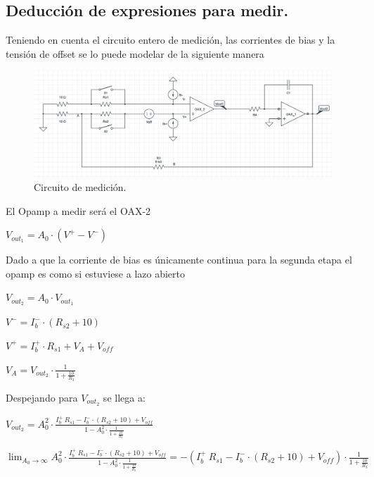 \subsection{Deducción de expresiones para medir.}

Teniendo en cuenta el circuito entero de medición, las corrientes de bias y la tensión de offset se lo puede modelar de la siguiente manera
\begin{figure}[H]	
	\centering
	\includegraphics[width=\textwidth]{imagenes/Medicion.PNG}
	\caption{Circuito de medición.}
	\label{fig:Medicion}
\end{figure}
El Opamp a medir será el OAX-2
\begin{center}$V_{out_1}=A_0 \cdot (V^+ - V^-)$\\\end{center}
Dado a que la corriente de bias es únicamente continua para la segunda etapa el opamp es como si estuviese a lazo abierto\\
\begin{center}$V_{out_2}=A_0 \cdot V_{out_1}$\\\end{center}
\begin{center}$V^-=I_b^- \cdot (R_{s2}+10)$\\\end{center}
\begin{center}$V^+=I_b^+ \cdot R_{s1} +V_A+V_{off}$\\\end{center}
\begin{center}$V_A=V_{out_2} \cdot \frac{1}{1+\frac{10}{R_3}}$\\\end{center}
Despejando para $V_{out_2}$ se llega a:
\begin{center}$V_{out_2}=A_0^2  \cdot \frac{I_b^+ \ R_{s1} -I_b^-\cdot (R_{s2}+10)+V_{off}}{1-A_0^2 \cdot \frac{1}{1+\frac{10}{R_3}}}$\\\end{center}
$\lim_{A_0\to\infty} A_0^2  \cdot \frac{I_b^+ \ R_{s1} -I_b^-\cdot (R_{s2}+10)+V_{off}}{1-A_0^2 \cdot \frac{1}{1+\frac{10}{R_3}}}=-(I_b^+ \ R_{s1} -I_b^-\cdot (R_{s2}+10)+V_{off})\cdot \frac{1}{1+\frac{10}{R_3}} $
